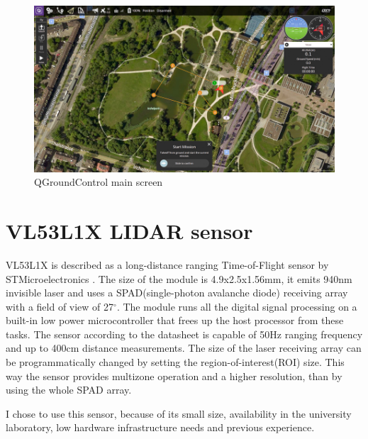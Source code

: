 \begin{figure}[h]
    \centering
    \includegraphics[width=130mm, keepaspectratio]{figures/qgc_start_screen.jpg}
    \caption{QGroundControl main screen\cite{QGCWebpage}}
    \label{fig:qgc_main_screen}
\end{figure}


\section{VL53L1X LIDAR sensor} \label{sect:vl53l1x_intro}

VL53L1X is described as a long-distance ranging Time-of-Flight sensor by STMicroelectronics \cite{VL53L1XDatasheet}. 
The size of the module is 4.9x2.5x1.56mm, it emits 940nm invisible laser and uses a SPAD(single-photon 
avalanche diode) receiving array with a field of view of 27$^{\circ}$. The module runs all the digital signal
processing on a built-in low power microcontroller that frees up the host processor from these tasks.
The sensor according to the datasheet is capable of 50Hz ranging frequency and up to 400cm distance 
measurements. The size of the laser receiving array can be programmatically changed by setting the
region-of-interest(ROI) size. This way the sensor provides multizone operation and a higher resolution, than
by using the whole SPAD array.

I chose to use this sensor, because of its small size, availability in the university laboratory, low hardware 
infrastructure needs and previous experience. 


